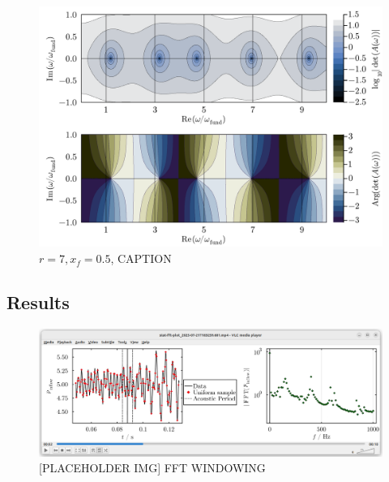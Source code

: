 \begin{figure}[t]
\centering
\includegraphics[scale=0.35]{assets/graphs/r=7_xf=05_complex_harmonics.pdf}
\caption{$r = 7, x_f = 0.5$, CAPTION}
\label{fig:flame-harmonics-complex}
\end{figure}





\subsection{Results}








\begin{figure}[t]
\centering
\includegraphics[scale=0.35]{assets/graphs/fft-windowing.png}
\caption{[PLACEHOLDER IMG] FFT WINDOWING}
\label{fig:windowing}
\end{figure}

